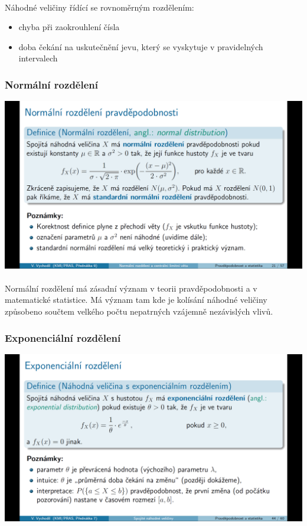 \documentclass[12pt,a4paper]{article}
\begin{document}
\paragraph{} Náhodné veličiny řídící se rovnoměrným rozdělením: \begin{itemize}
	\item chyba při zaokrouhlení čísla
	\item doba čekání na uskutečnění jevu, který se vyskytuje v pravidelných intervalech
\end{itemize}
\subsubsection{Normální rozdělení}
\begin{center}
	\includegraphics[scale=0.32]{img/spojite_rozdeleni_normalni}
\end{center}
\paragraph{} Normální rozdělení má zásadní význam v teorii pravděpodobnosti a v matematické statistice. Má význam tam kde je kolísání náhodné veličiny způsobeno součtem velkého počtu nepatrných vzájemně nezávislých vlivů.

\subsubsection{Exponenciální rozdělení}
\begin{center}
	\includegraphics[scale=0.32]{img/spojite_rozdeleni_exponencialni}
\end{center}
\end{document}

